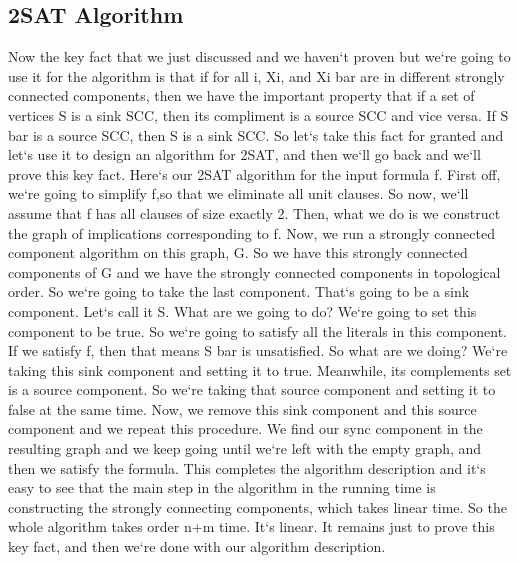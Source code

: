 \subsection{2SAT Algorithm}
Now the key fact that we just discussed and we haven`t proven but we`re going to use it for the algorithm is that if for all i, Xi, and Xi bar are in different strongly connected components, then we have the important property that if a set of vertices S is a sink SCC, then its compliment is a source SCC and vice versa.
If S bar is a source SCC, then S is a sink SCC\@.
So let`s take this fact for granted and let`s use it to design an algorithm for 2SAT, and then we`ll go back and we`ll prove this key fact.
Here`s our 2SAT algorithm for the input formula f.
First off, we`re going to simplify f,so that we eliminate all unit clauses.
So now, we`ll assume that f has all clauses of size exactly 2.
Then, what we do is we construct the graph of implications corresponding to f.
Now, we run a strongly connected component algorithm on this graph, G\@.
So we have this strongly connected components of G and we have the strongly connected components in topological order.
So we`re going to take the last component.
That`s going to be a sink component.
Let`s call it S\@.
What are we going to do? We`re going to set this component to be true.
So we`re going to satisfy all the literals in this component.
If we satisfy f, then that means S bar is unsatisfied.
So what are we doing? We`re taking this sink component and setting it to true.
Meanwhile, its complements set is a source component.
So we`re taking that source component and setting it to false at the same time.
Now, we remove this sink component and this source component and we repeat this procedure.
We find our sync component in the resulting graph and we keep going until we`re left with the empty graph, and then we satisfy the formula.
This completes the algorithm description and it`s easy to see that the main step in the algorithm in the running time is constructing the strongly connecting components, which takes linear time.
So the whole algorithm takes order n+m time.
It`s linear.
It remains just to prove this key fact, and then we`re done with our algorithm description.

